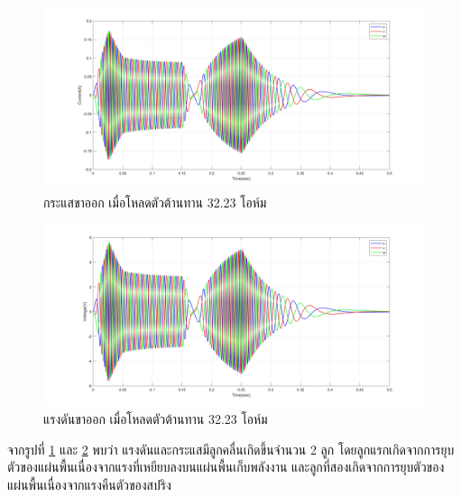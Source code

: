\documentclass[11pt,a4paper]{article}
\begin{document}
\begin{figure}[H]
    \begin{center}
        \includegraphics[width=1\textwidth]{current_1.jpg}
    \end{center}
    \caption{กระแสขาออก เมื่อโหลดตัวต้านทาน 32.23 โอห์ม}
    \label{current_1}
\end{figure}
\begin{figure}[H]
    \begin{center}
        \includegraphics[width=1\textwidth]{voltage_1.jpg}
    \end{center}
    \caption{แรงดันขาออก เมื่อโหลดตัวต้านทาน 32.23 โอห์ม}
    \label{voltage_1}
\end{figure}


จากรูปที่ \ref{current_1} และ \ref{voltage_1} พบว่า แรงดันและกระแสมีลูกคลื่นเกิดขึ้นจำนวน 2 ลูก โดยลูกแรกเกิดจากการยุบตัวของแผ่นพื้นเนื่องจากแรงที่เหยียบลงบนแผ่นพื้นเก็บพลังงาน และลูกที่สองเกิดจากการยุบตัวของแผ่นพื้นเนื่องจากแรงคืนตัวของสปริง
\end{document}
